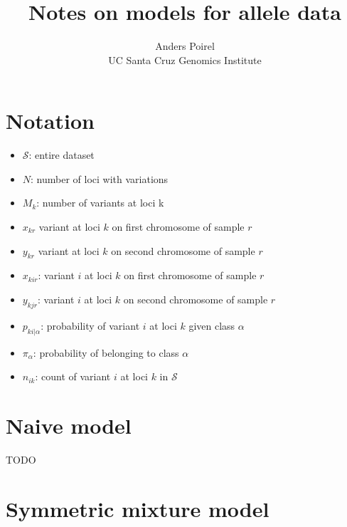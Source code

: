 \documentclass[12pt]{article}
\title{Notes on models for allele data}
\author{Anders Poirel \\ UC Santa Cruz Genomics Institute}
\begin{document}
    
\maketitle

\section*{Notation}

\begin{itemize} \itemsep -1pt
    \item $\mathcal{S}$: entire dataset
    \item $N$: number of loci with variations
    \item $M_k$: number of variants at loci k
    \item $x_{kr}$ variant at loci $k$ on first chromosome of sample $r$
    \item $y_{kr}$ variant at loci $k$ on second chromosome of sample $r$ 
    \item $x_{kir}$: variant $i$ at loci $k$ on first chromosome of sample $r$
    \item $y_{kjr}$: variant $i$ at loci $k$ on second chromosome of sample $r$
    \item $p_{ki| \alpha}$: probability of variant $i$ at loci $k$ given class $\alpha$
    \item $\pi_\alpha$: probability of belonging to class $\alpha$
    \item $n_{ik}$: count of variant $i$ at loci $k$ in $\mathcal{S}$
\end{itemize}

\section{Naive model}

TODO

\section{Symmetric mixture model}
\end{document}

